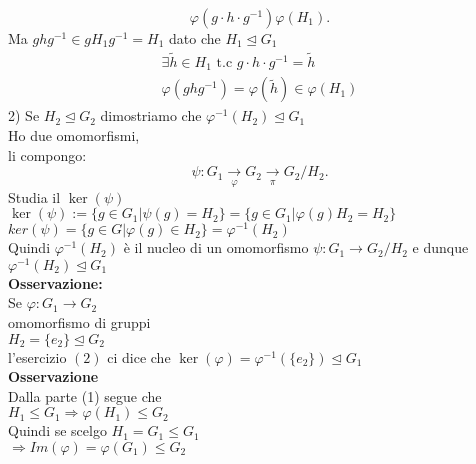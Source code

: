 \documentclass[12px]{article}
\begin{document}
	\[
		\varphi(g\cdot h\cdot g^{-1}) \varphi(H_1)
	.\] 
	Ma $ghg^{-1}\in gH_1g^{-1}=H_1$ dato che $H_1\trianglelefteq G_1$\\
	\begin{gather*}
		\exists \tilde h\in H_1 \text { t.c } g\cdot h\cdot g^{-1} = \tilde h\\
		\varphi(ghg^{-1}) = \varphi(\tilde h)\in \varphi(H_1)
	\end{gather*}
	2) Se $H_2\trianglelefteq G_2$ dimostriamo che $ \varphi^{-1}(H_2)\trianglelefteq G_1$\\
	Ho due omomorfismi,\\
	li compongo:
	\[
		\psi: G_1 \xrightarrow[ \varphi]{} G_2 \xrightarrow[\pi]{} G_2/H_2
	.\] 
	Studia il $\ker (\psi)$\\
	 $\ker(\psi):= \lbrace g\in G_1 | \psi (g) = H_2\rbrace = \lbrace g\in G_1 | \varphi(g)H_2 = H_2\rbrace$\\
	 $ker (\psi) = \lbrace g\in G | \varphi(g)\in H_2 \rbrace = \varphi^{-1}(H_2)$\\
	 Quindi $ \varphi^{-1}(H_2)$ è il nucleo di un omomorfismo $\psi : G_1 \rightarrow G_2/H_2$ e dunque $ \varphi^{-1}(H_2)\trianglelefteq G_1$\\
	 \textbf{Osservazione:}\\
	 Se $ \varphi:G_1 \rightarrow G_2$\\
	 omomorfismo di gruppi\\
	 $H_2 = \lbrace e_2 \rbrace \trianglelefteq G_2$\\
	 l'esercizio $(2)$ ci dice che  $\ker( \varphi) = \varphi^{-1}(\lbrace e_2\rbrace)\trianglelefteq G_1$\\
	 \textbf{Osservazione}\\
	 Dalla parte (1) segue che\\
	 $H_1\leq G_1 \Rightarrow \varphi(H_1)\leq G_2$ \\
	 Quindi  se scelgo $H_1=G_1\leq G_1$\\
	 $ \Rightarrow Im( \varphi) = \varphi(G_1)\leq G_2$ 
\end{document}
